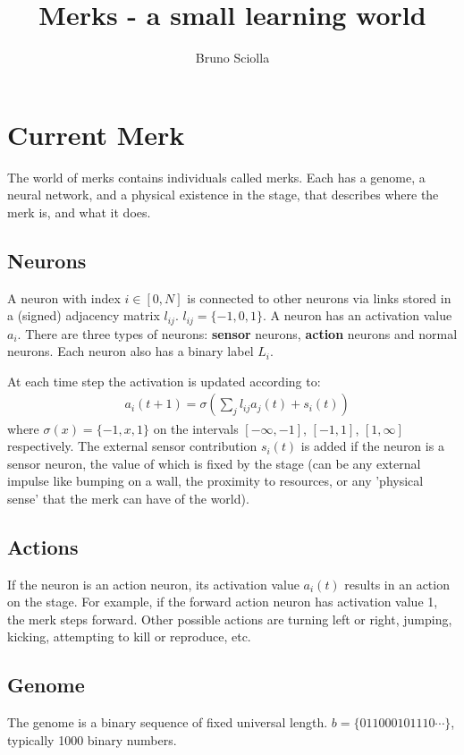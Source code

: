 \documentclass[twocolumn,groupedaddress,floatfix]{article}
\begin{document}
\title{Merks - a small learning world}
\author{Bruno Sciolla}


\maketitle



\section{Current Merk}

The world of merks contains individuals called merks.
Each has a genome, a neural network, and a physical existence in the stage, that describes where the merk is, and what it does.
\subsection{Neurons}
A neuron with index $i \in [0, N]$ is connected to other neurons via links stored in a (signed) adjacency matrix $l_{ij}$. $l_{ij} = \{ -1, 0, 1\}$. A neuron has an activation value $a_i$. There are three types of neurons: {\bf sensor} neurons, {\bf action} neurons and normal neurons. Each neuron also has a binary label $L_i$.


At each time step the activation is updated according to:
\begin{align}
& a_i(t+1) = \sigma \left( \sum_j l_{ij} a_j(t) + s_i(t) \right)
\end{align}
where $\sigma(x) = \{-1,x,1\}$ on the intervals $[-\infty, -1]$, $[-1, 1]$, $[1, \infty]$ respectively.
The external sensor contribution $s_i(t)$ is added if the neuron is a sensor neuron, the value of which is fixed by the stage (can be any external impulse like bumping on a wall, the proximity to resources, or any 'physical sense' that the merk can have of the world).

\subsection{Actions}
If the neuron is an action neuron, its activation value $a_i(t)$ results in an action on the stage. For example, if the forward action neuron has activation value 1, the merk steps forward. Other possible actions are turning left or right, jumping, kicking, attempting to kill or reproduce, etc.

\subsection{Genome}
The genome is a binary sequence of fixed universal length.
$b = \{ 011000101110 \cdots \}$, typically 1000 binary numbers.
\end{document}
